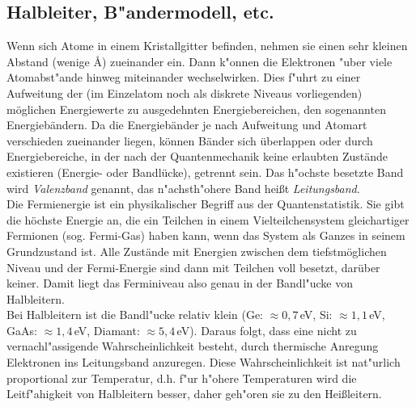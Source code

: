 \subsection{Halbleiter, B"andermodell, etc.}

Wenn sich Atome in einem Kristallgitter befinden, nehmen sie einen sehr kleinen Abstand (wenige \AA) zueinander ein. Dann k"onnen die Elektronen "uber viele Atomabst"ande hinweg miteinander wechselwirken. Dies f"uhrt zu einer Aufweitung der (im Einzelatom noch als diskrete Niveaus vorliegenden) möglichen Energiewerte zu ausgedehnten Energiebereichen, den sogenannten Energiebändern. Da die Energiebänder je nach Aufweitung und Atomart verschieden zueinander liegen, können Bänder sich überlappen oder durch Energiebereiche, in der nach der Quantenmechanik keine erlaubten Zustände existieren (Energie- oder Bandlücke), getrennt sein. Das h"ochste besetzte Band wird \textit{Valenzband} genannt, das n"achsth"ohere Band hei{\ss}t \textit{Leitungsband}.\\
Die Fermienergie ist ein physikalischer Begriff aus der Quantenstatistik. Sie gibt die höchste Energie an, die ein Teilchen in einem Vielteilchensystem gleichartiger Fermionen (sog. Fermi-Gas) haben kann, wenn das System als Ganzes in seinem Grundzustand ist. Alle Zustände mit Energien zwischen dem tiefstmöglichen Niveau und der Fermi-Energie sind dann mit Teilchen voll besetzt, darüber keiner. Damit liegt das Ferminiveau also genau in der Bandl"ucke von Halbleitern.\\
Bei Halbleitern ist die Bandl"ucke relativ klein (Ge: $\approx 0,7$\,eV, Si: $\approx 1,1$\,eV, GaAs: $\approx 1,4$\,eV, Diamant: $\approx 5,4$\,eV). Daraus folgt, dass eine nicht zu vernachl"assigende Wahrscheinlichkeit besteht, durch thermische Anregung Elektronen ins Leitungsband anzuregen. Diese Wahrscheinlichkeit ist nat"urlich proportional zur Temperatur, d.h. f"ur h"ohere Temperaturen wird die Leitf"ahigkeit von Halbleitern besser, daher geh"oren sie zu den Hei{\ss}leitern.

\noindent

